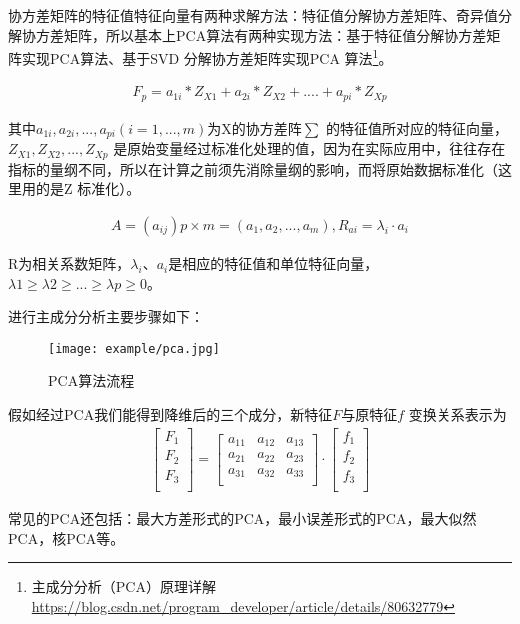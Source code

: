 协方差矩阵的特征值特征向量有两种求解方法：特征值分解协方差矩阵、奇异值分解协方差矩阵，所以基本上PCA算法有两种实现方法：基于特征值分解协方差矩阵实现PCA算法、基于SVD 分解协方差矩阵实现PCA 算法\footnote{主成分分析（PCA）原理详解 \quad \url{https://blog.csdn.net/program_developer/article/details/80632779}}。

\begin{eqnarray}
F_p = a_{1i}*Z_{X1} + a_{2i}*Z_{X2} + .... + a_{pi}*Z_{Xp}
\end{eqnarray}

其中$a_{1i}, a_{2i}, ...,a_{pi}(i=1,...,m)$为X的协方差阵$\sum$ 的特征值所对应的特征向量，$Z_{X1}, Z_{X2}, ..., Z_{Xp}$ 是原始变量经过标准化处理的值，因为在实际应用中，往往存在指标的量纲不同，所以在计算之前须先消除量纲的影响，而将原始数据标准化（这里用的是Z 标准化）。

\begin{eqnarray}
A = (a_{ij})p \times m = (a_1,a_2,...,a_m), R_{ai} = \lambda_{i} \cdot a_{i}
\end{eqnarray}

R为相关系数矩阵，$\lambda_{i}$、$a_i$是相应的特征值和单位特征向量，$λ1 \geq λ2 \geq ...\geq λp \geq 0$。

进行主成分分析主要步骤如下：
\begin{figure}[!htp]
\centering
\texttt{[image: example/pca.jpg]}
\caption{PCA算法流程}
\label{fig1:3-1}
\end{figure}

假如经过PCA我们能得到降维后的三个成分，新特征$F$与原特征$f$ 变换关系表示为
\begin{align}
\begin{bmatrix}
F_1 \\
F_2 \\
F_3 \\
\end{bmatrix}
=
\begin{bmatrix}
a_{11} & a_{12} & a_{13} \\
a_{21} & a_{22} & a_{23} \\
a_{31} & a_{32} & a_{33} \\
\end{bmatrix}
\cdot
\begin{bmatrix}
f_1 \\
f_2 \\
f_3 \\
\end{bmatrix} \nonumber
\end{align}

常见的PCA还包括：最大方差形式的PCA，最小误差形式的PCA，最大似然PCA，核PCA等。

